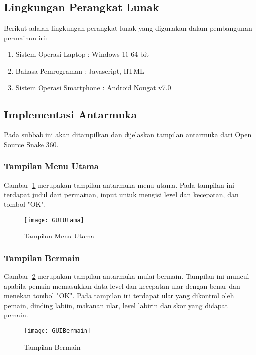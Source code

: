 \subsection{Lingkungan Perangkat Lunak}
Berikut adalah lingkungan perangkat lunak yang digunakan dalam pembangunan permainan ini:

\begin{enumerate}
	\item Sistem Operasi Laptop : Windows 10 64-bit
	\item Bahasa Pemrograman : Javascript, HTML
	\item Sistem Operasi Smartphone : Android Nougat v7.0
\end{enumerate}

\subsection{Implementasi Antarmuka}
Pada subbab ini akan ditampilkan dan dijelaskan tampilan antarmuka dari Open Source Snake 360.

\subsubsection{Tampilan Menu Utama}
Gambar~\ref{fig:GUIUtama} merupakan tampilan antarmuka menu utama. Pada tampilan ini terdapat judul dari permainan, input untuk mengisi level dan kecepatan, dan tombol "OK". 

\begin{figure}[H]
	\centering  
	\texttt{[image: GUIUtama]}  
	\caption[Tampilan Menu Utama]{Tampilan Menu Utama}
	\label{fig:GUIUtama} 
\end{figure}

\subsubsection{Tampilan Bermain}
Gambar~\ref{fig:GUIBermain} merupakan tampilan antarmuka mulai bermain. Tampilan ini muncul apabila pemain memasukkan data level dan kecepatan ular dengan benar dan menekan tombol "OK". Pada tampilan ini terdapat ular yang dikontrol oleh pemain, dinding labiin, makanan ular, level labirin dan skor yang didapat pemain.

\begin{figure}[H]
	\centering  
	\texttt{[image: GUIBermain]}  
	\caption[Tampilan Bermain]{Tampilan Bermain}
	\label{fig:GUIBermain} 
\end{figure}

